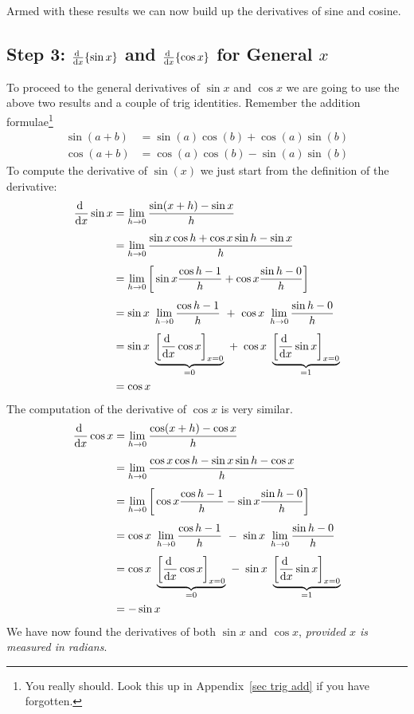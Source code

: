 Armed with these results we can now build up the derivatives of sine and
cosine.
\goodbreak
\subsection*{Step 3: $\diff{}{x} \{ \sin x \}$ and $\diff{}{x} \{ \cos x\}$
for General $x$}
To proceed to the general derivatives of $\sin x$ and $\cos x$
we are going to use the above
two results and a couple of trig identities. Remember the addition
formulae\footnote{You really should. Look this up in Appendix~\ref{sec trig add} if you
have forgotten.}
\begin{align*}
  \sin(a+b) &= \sin(a) \cos(b) + \cos(a) \sin(b)\\
  \cos(a+b) &= \cos(a) \cos(b) - \sin(a) \sin(b)
\end{align*}
To compute the derivative of $\sin(x)$ we just start from the definition of the
derivative:
\begin{align*}
\diff{}{x}\sin x
&=\lim_{h\rightarrow 0}\frac{\sin (x+h)-\sin x}{h} \\[0.05in]
&=\lim_{h\rightarrow 0}\frac{\sin x\cos h +\cos x\sin h-\sin x}{h} \\[0.05in]
&=\lim_{h\rightarrow 0}\bigg[\sin x\frac{\cos h-1}{h}
                            +\cos x\frac{\sin h-0}{h}\bigg] \\[0.05in]
&=\sin x\ \lim_{h\rightarrow 0}\frac{\cos h-1}{h}
  \ +\ \cos x\ \lim_{h\rightarrow 0}\frac{\sin h-0}{h} \\[0.05in]
&=\sin x\ \underbrace{\bigg[\diff{}{x}\cos x\bigg]_{x=0}}_{=0}
  \ +\ \cos x\ \underbrace{\bigg[\diff{}{x}\sin x\bigg]_{x=0}}_{=1} \\
&=\cos x
\end{align*}
The computation of the derivative of $\cos x$ is very similar.
\begin{align*}
\diff{}{x}\cos x
&=\lim_{h\rightarrow 0}\frac{\cos (x+h)-\cos x}{h} \\[0.05in]
&=\lim_{h\rightarrow 0}\frac{\cos x\cos h -\sin x\sin h-\cos x}{h} \\[0.05in]
&=\lim_{h\rightarrow 0}\bigg[\cos x\frac{\cos h-1}{h}
                            -\sin x\frac{\sin h-0}{h}\bigg] \\[0.05in]
&=\cos x\ \lim_{h\rightarrow 0}\frac{\cos h-1}{h}
  \ -\ \sin x\ \lim_{h\rightarrow 0}\frac{\sin h-0}{h} \\[0.05in]
&=\cos x\ \underbrace{\bigg[\diff{}{x}\cos x\bigg]_{x=0}}_{=0}
  \ -\ \sin x\ \underbrace{\bigg[\diff{}{x}\sin x\bigg]_{x=0}}_{=1} \\
&=-\sin x
\end{align*}
We have now found the derivatives of both $\sin x$ and $\cos x$,
\textit{provided $x$ is measured in radians}.

